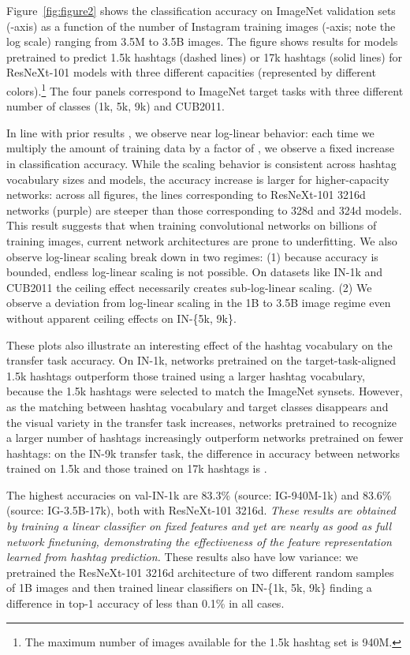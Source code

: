 \documentclass[runningheads]{llncs}
\begin{document}
Figure~\ref{fig:figure2} shows the classification accuracy on ImageNet validation sets (-axis) as a function of the number of Instagram training images (-axis; note the log scale) ranging from 3.5M to 3.5B images. The figure shows results for models pretrained to predict 1.5k hashtags (dashed lines) or 17k hashtags (solid lines) for ResNeXt-101 models with three different capacities (represented by different colors).\footnote{The maximum number of images available for the 1.5k hashtag set is 940M.} The four panels correspond to ImageNet target tasks with three different number of classes (1k, 5k, 9k) and CUB2011.

In line with prior results \cite{joulin2016learning,sun2017unreasonable}, we observe near log-linear behavior: each time we multiply the amount of training data by a factor of , we observe a fixed increase  in classification accuracy. While the scaling behavior is consistent across hashtag vocabulary sizes and models, the accuracy increase  is larger for higher-capacity networks: across all figures, the lines corresponding to ResNeXt-101 3216d networks (purple) are steeper than those corresponding to 328d and 324d models. This result suggests that when training convolutional networks on billions of training images, current network architectures are prone to underfitting. We also observe log-linear scaling break down in two regimes: (1) because accuracy is bounded, endless log-linear scaling is not possible. On datasets like IN-1k and CUB2011 the ceiling effect necessarily creates sub-log-linear scaling. (2) We observe a deviation from log-linear scaling in the 1B to 3.5B image regime even without apparent ceiling effects on IN-\{5k, 9k\}.


These plots also illustrate an interesting effect of the hashtag vocabulary on the transfer task accuracy. On IN-1k, networks pretrained on the target-task-aligned 1.5k hashtags outperform those trained using a larger hashtag vocabulary, because the 1.5k hashtags were selected to match the ImageNet synsets. However, as the matching between hashtag vocabulary and target classes disappears and the visual variety in the transfer task increases, networks pretrained to recognize a larger number of hashtags increasingly outperform networks pretrained on fewer hashtags: on the IN-9k transfer task, the difference in accuracy between networks trained on 1.5k and those trained on 17k hashtags is .

The highest accuracies on val-IN-1k are 83.3\% (source: IG-940M-1k) and 83.6\% (source: IG-3.5B-17k), both with ResNeXt-101 3216d. \emph{These results are obtained by training a linear classifier on fixed features and yet are nearly as good as full network finetuning, demonstrating the effectiveness of the feature representation learned from hashtag prediction.} These results also have low variance: we pretrained the ResNeXt-101 3216d architecture of two different random samples of 1B images and then trained linear classifiers on IN-\{1k, 5k, 9k\} finding a difference in top-1 accuracy of less than 0.1\% in all cases.
\end{document}
